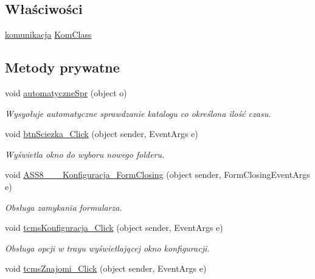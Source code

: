 \subsection*{Właściwości}
\begin{CompactItemize}
\item 
\hyperlink{a00013}{komunikacja} \hyperlink{a00014_ebc21fd88f797ade28feaaa274769fa8}{KomClass}
\end{CompactItemize}
\subsection*{Metody prywatne}
\begin{CompactItemize}
\item 
void \hyperlink{a00014_49a6172f91f2b718c2838960918afba7}{automatyczneSpr} (object o)
\begin{CompactList}\small\item\em Wysyołuje automatyczne sprawdzanie katalogu co określona ilość czasu. \item\end{CompactList}\item 
void \hyperlink{a00014_43e125d87ba2497d29d9ad6ea456c62d}{btnSciezka\_\-Click} (object sender, EventArgs e)
\begin{CompactList}\small\item\em Wyświetla okno do wyboru nowego folderu. \item\end{CompactList}\item 
void \hyperlink{a00014_f679b61007ce606b466155103b678d40}{ASS8\_\-\_\-\_\-Konfiguracja\_\-FormClosing} (object sender, FormClosingEventArgs e)
\begin{CompactList}\small\item\em Obsługa zamykania formularza. \item\end{CompactList}\item 
void \hyperlink{a00014_321774e21dbe196e41840825cbe7c915}{tcmsKonfiguracja\_\-Click} (object sender, EventArgs e)
\begin{CompactList}\small\item\em Obsługa opcji w trayu wyświetlającej okno konfiguracji. \item\end{CompactList}\item 
void \hyperlink{a00014_e273925aef74f02490b3a4ac6af6b779}{tcmsZnajomi\_\-Click} (object sender, EventArgs e)

\end{CompactItemize}
